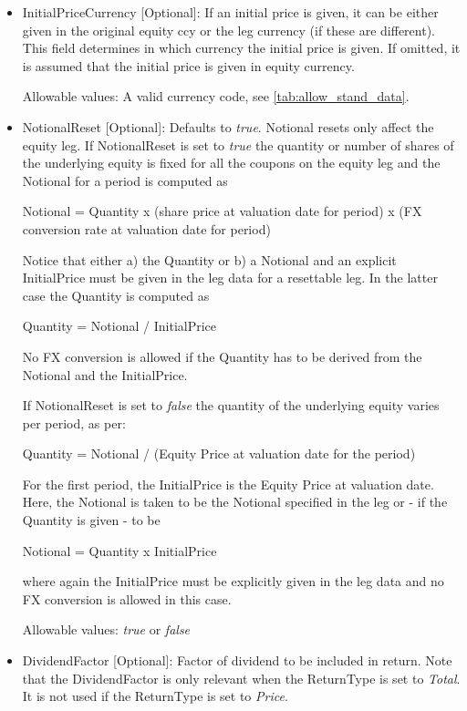 \begin{itemize}
\item InitialPriceCurrency [Optional]: If an initial price is given, it can be either given in the original equity ccy
  or the leg currency (if these are different). This field determines in which currency the initial price is given. If
  omitted, it is assumed that the initial price is given in equity currency.

Allowable values: A valid currency code, see \ref{tab:allow_stand_data}.

\item NotionalReset [Optional]: Defaults to \emph{true}.  Notional resets only affect the equity leg. If NotionalReset
  is set to \emph{true} the quantity or number of shares of the underlying equity is fixed for all the coupons on the
  equity leg and the Notional for a period is computed as

  Notional = Quantity x (share price at valuation date for period) x (FX conversion rate at valuation date for period)

  Notice that either a) the Quantity or b) a Notional and an explicit InitialPrice must be given in the leg data for a
  resettable leg. In the latter case the Quantity is computed as

  Quantity = Notional / InitialPrice

  No FX conversion is allowed if the Quantity has to be derived from the Notional and the InitialPrice.

  If NotionalReset is set to \emph{false} the quantity of the underlying equity varies per period, as per:
  
  Quantity = Notional / (Equity Price at valuation date for the period)

For the first period, the InitialPrice is the Equity Price at valuation date.
Here, the Notional is taken to be the Notional specified in the leg or - if the Quantity is given - to be

  Notional = Quantity x InitialPrice

  where again the InitialPrice must be explicitly given in the leg data and no FX conversion is allowed in this case.

  Allowable values:  \emph{true} or  \emph{false}

\item DividendFactor [Optional]: Factor of dividend to be included in return. Note that the DividendFactor is only relevant when the ReturnType is set to  \emph{Total}. It is not used if the ReturnType is set to \emph{Price}.


\end{itemize}
